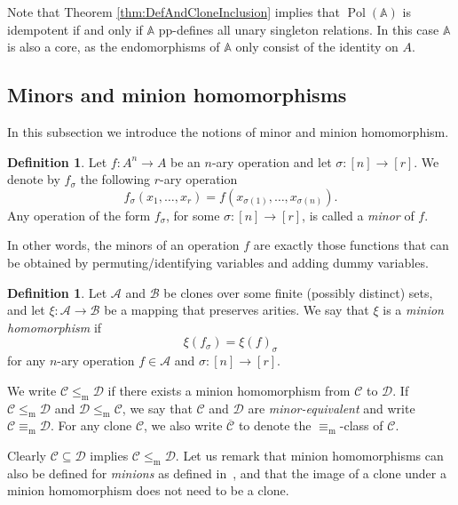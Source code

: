 \documentclass[12pt]{amsart}
\theoremstyle{definition}
\theoremstyle{definition}
\newtheorem{definition}[theorem]{Definition}
\newcommand{\struct}[1]{\mathbb{#1}}
\newcommand{\clo}[1]{\mathcal{#1}}
\DeclareMathOperator{\Pol}{Pol}
\newcommand{\isaminorof}{\leq_{\mathrm{m}}}
\newcommand{\minorequivalentto}{\equiv_{\mathrm{m}}}
\begin{document}
Note that Theorem \ref{thm:DefAndCloneInclusion} implies that $\Pol(\struct{A})$ is idempotent if and only if $\struct{A}$ pp-defines all unary singleton relations. In this case $\struct{A}$ is also a core, as the endomorphisms of $\struct{A}$ only consist of the identity on $A$.


\subsection{Minors and minion homomorphisms} \label{sec:ourposet}

In this subsection we introduce the notions of minor and minion homomorphism.
\begin{definition}\label{def:minor}
Let $f\colon A^n \to A$ be an $n$-ary operation and let $\sigma \colon [n] \to [r]$. We denote by $f_\sigma$ the following $r$-ary operation 
\begin{equation*}
f_\sigma(x_1,\dots,x_{r}) = f(x_{\sigma(1)},\dots,x_{\sigma(n)}).
\end{equation*}
Any operation of the form $f_\sigma$, for some $\sigma \colon [n]\to [r]$, is called a \emph{minor} of $f$.
\end{definition}

In other words, the minors of an operation $f$ are exactly those functions that can be obtained by permuting/identifying variables and adding dummy variables.

\begin{definition}\label{def:minorpreservingmaps}
Let $\clo{A}$ and $\clo{B}$ be clones over some finite (possibly distinct) sets, and let $\xi \colon \clo{A} \to \clo{B}$ be a mapping that preserves arities. We say that $\xi$ is a \emph{minion homomorphism} if
\begin{equation*}
\xi(f_\sigma) = \xi(f)_\sigma
\end{equation*}
for any $n$-ary operation $f \in \clo{A}$ and $\sigma\colon [n] \to [r]$. 

We write $\clo{C}\isaminorof\clo{D}$ if there exists a minion homomorphism
from $\clo{C}$
to $\clo{D}$. 
If $\clo{C}\isaminorof\clo{D}$ and
$\clo{D}\isaminorof\clo{C}$,
we say that $\clo{C}$ and $\clo{D}$ are
\emph{minor-equivalent} and write
$\clo{C}\minorequivalentto\clo{D}$. For any clone $\clo{C}$, we also write $\overline{\clo{C}}$ to denote the $\minorequivalentto$-class of $\clo{C}$.
\end{definition}

Clearly $\clo{C}\subseteq\clo{D}$ implies $\clo{C}\isaminorof\clo{D}$. Let us remark that minion homomorphisms can also be defined for \emph{minions} as defined in~\cite{jakubPCSP}, and that the image of a clone under a minion homomorphism does not need to be a clone.
\end{document}
